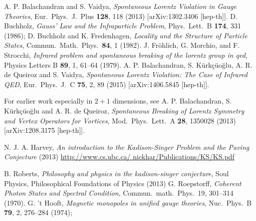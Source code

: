 \begin{thebibliography}{99}
 A. P. Balachandran and S. Vaidya, \textit{Spontaneous Lorentz Violation in Gauge Theories}, Eur.\ Phys.\ J.\ Plus \textbf{128}, 118 (2013) [arXiv:1302.3406 [hep-th]]. 
 D. Buchholz, \textit{Gauss' Law and the Infraparticle Problem}, Phys.\ Lett.\ B \textbf{174}, 331 (1986); D. Buchholz and K. Fredenhagen, \textit{Locality and the Structure of Particle States}, Commun.\ Math.\ Phys.\ \textbf{84}, 1 (1982). 
 J. Fr\"ohlich, G. Morchio, and F. Strocchi, \textit{Infrared problem and spontaneous breaking of the lorentz group in qed}, Physics Letters B \textbf{89}, 1, 61--64 (1979).
 A. P. Balachandran, S. K\"urk\c{c}\"uo\u{g}lu, A. R. de Queiroz and S. Vaidya, \textit{Spontaneous Lorentz Violation: The Case of Infrared QED}, Eur.\ Phys.\ J.\ C \textbf{75}, 2, 89 (2015) [arXiv:1406.5845 [hep-th]].

For earlier work especially in $2+1$ dimensions, see A. P. Balachandran, S. K\"urk\c{c}\"uo\u{g}lu and A. R. de Queiroz, \textit{Spontaneous Breaking of Lorentz Symmetry and Vertex Operators for Vortices}, Mod.\ Phys.\ Lett.\ A \textbf{28}, 1350028 (2013) [arXiv:1208.3175 [hep-th]].

 N. J. A. Harvey, \textit{An introduction to the Kadison-Singer Problem and the Paving Conjecture} (2013) \url{http://www.cs.ubc.ca/ nickhar/Publications/KS/KS.pdf} 

B. Roberts, \textit{Philosophy and physics in the kadison-singer conjecture}, Soul Physics, Philosophical Foundations of Physics (2013)
 G. Roepstorff, \textit{Coherent Photon States and Spectral Condition}, Commun.\ math.\ Phys.\ 19, 301--314 (1970).
 G. 't Hooft, \textit{Magnetic monopoles in unified gauge theories}, Nuc.\ Phys.\ B \textbf{79}, 2, 276--284 (1974);


\end{thebibliography}
